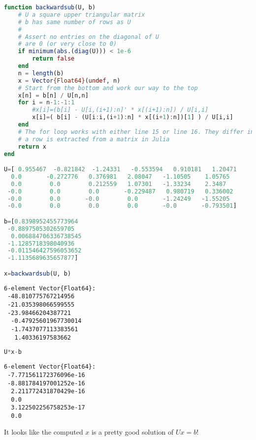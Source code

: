 \begin{lstlisting}[language=Julia,style=mystyle]
function backwardsub(U, b)
    # U a square upper triangular matrix
    # b has same number of rows as U
    #
    # Assert no entries on the diagonal of U
    # are 0 (or very close to 0)
    if minimum(abs.(diag(U))) < 1e-6
        return false
    end    
    n = length(b)
    x = Vector{Float64}(undef, n)
    # Start from the bottom and work our way to the top
    x[n] = b[n] / U[n,n]
    for i = n-1:-1:1
        #x[i]=(b[i] - U[i,(i+1):n]' * x[(i+1):n]) / U[i,i]
        x[i]=( b[i] - (U[i:i,(i+1):n] * x[(i+1):n])[1] ) / U[i,i]
    end 
    # The for loop works with either line 15 or line 16. They differ in how
    # a row is extracted from a matrix in Julia
    return x    
end

U=[ 0.955467  -0.821842  -1.24331   -0.553594   0.910181   1.20471
  0.0       -0.272776   0.376981   2.08047   -1.10505    1.05765
  0.0        0.0        0.212559   1.07301   -1.33234    2.3487
 -0.0        0.0        0.0       -0.229487   0.980719   0.336002
 -0.0        0.0       -0.0        0.0       -1.24249   -1.55205
 -0.0        0.0        0.0        0.0       -0.0       -0.793501]

b=[0.8398952455773964
 -0.8897505302659705
  0.006884706336738545
 -1.1285718398040936
 -0.011546427596053652
 -1.1135689635657877]

x=backwardsub(U, b)
\end{lstlisting}
\begin{verbatim}
6-element Vector{Float64}:
 -48.810775767214956
 -21.035398066599555
 -23.98466204387721
  -0.47925601967730014
  -1.7437077113383561
   1.40336197583662
 \end{verbatim}
 
 \begin{lstlisting}[language=Julia,style=mystyle]
 U*x-b \end{lstlisting}
\begin{verbatim}
6-element Vector{Float64}:
 -7.771561172376096e-16
 -8.881784197001252e-16
  2.211772431870429e-16
  0.0
  3.122502256758253e-17
  0.0
 \end{verbatim}
 It looks like the computed $x$ is a pretty good solution of $Ux = b$! 
 \Qed
 
 

